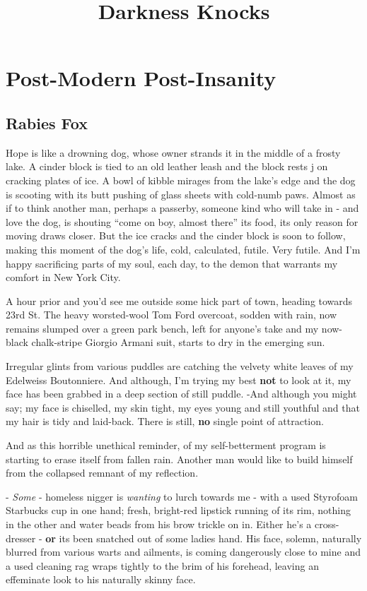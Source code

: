\documentclass[19pt,openany]{book}
\title{\textbf{D}ar\textbf{k}ness \textbf{K}noc\textbf{k}s}
\author{}
\date{}
\begin{document}
\maketitle
\tableofcontents
\part{Post-Modern Post-Insanity}
\chapter{Rabies Fox}
Hope is like a drowning dog,
whose owner strands it in
the middle of a frosty lake.
A cinder block is tied to
an old leather leash and the
block rests j
on cracking plates of ice. A
bowl of kibble mirages from the lake's
edge and the dog is scooting with its
butt pushing of glass sheets
with cold-numb paws. Almost as if to think
another man, perhaps a passerby, someone kind
who will take in - and love the dog, is shouting
``come on boy, almost there'' its
food, its only reason for moving
draws closer. But the ice cracks and
the cinder block is soon to follow,
making this moment of the dog's life,
cold, calculated, futile. Very futile.
And I'm
happy sacrificing parts of
my soul, each day, to the
demon that warrants my comfort
in New York City.

A hour prior and you'd
see me outside some hick part of
town, heading towards 23rd St.
The heavy worsted-wool
Tom Ford overcoat, sodden with
rain, now remains slumped over a green park bench,
left for anyone's take and my
now-black chalk-stripe
Giorgio Armani
suit, starts to dry in the emerging sun.

Irregular glints from various puddles
are catching the velvety white leaves of my Edelweiss Boutonniere.
And although, I'm trying my best \textbf{not} to look at it, my face
has been grabbed in a deep section of
still puddle. -And although you
might say; my face is chiselled, my
skin tight, my eyes young and
still youthful and that my
hair is tidy and laid-back.
There is still, \textbf{no} single
point of attraction.

And as this horrible unethical
reminder, of my self-betterment
program is starting to erase
itself from fallen rain. Another
man would like to build himself
from the collapsed remnant of my
reflection.

- \textit{Some} - homeless nigger is \textit{wanting}
to lurch towards me -
with a used Styrofoam Starbucks cup in
one hand;
fresh, bright-red lipstick running
of its rim,
nothing in the other and water beads
from his brow trickle on in.
Either he's a cross-dresser -
\textbf{or} its been snatched out of some
ladies hand.
His face, solemn, naturally
blurred from various warts and ailments, is coming
dangerously close to mine and a used cleaning rag
wraps tightly to the brim of his forehead, leaving
an effeminate look to his naturally skinny face.
\end{document}
